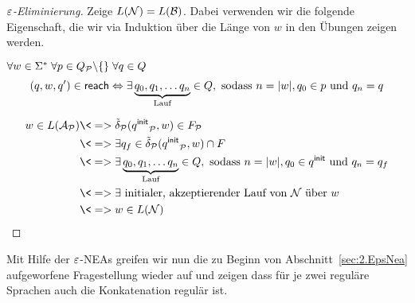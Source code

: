\begin{proof}[$\varepsilon$-Eliminierung]
        Zeige $L(\mathcal{N})=L(\mathcal{B})$. Dabei verwenden wir die folgende Eigenschaft, die wir via Induktion über die Länge von $w$ in den Übungen zeigen werden.
        
        $\forall w\in\Sigma^*\; \forall p\in Q_{\mathcal{P}}\backslash\{\}\; \forall q\in Q$
        $$(q,w,q')\in\textsf{reach} \Leftrightarrow \exists \underbrace{q_0, q_1,\ldots q_n}_{\text{Lauf}}\in Q, \text{ sodass }  n=|w|, q_0\in p \text{ und } q_n=q$$

        \begin{align*}
         w\in L(\A_\calP) 
         &\<=> \tilde\delta_\calP(\qinit_\calP,w)\in F_\calP\\
         &\<=> \exists q_f\in \tilde\delta_\calP(\qinit_\calP,w)\cap F\\
         &\<=> \exists \underbrace{q_0, q_1,\ldots q_n}_{\text{Lauf}}\in Q, \text{ sodass }  n=|w|, q_0\in \qinit \text{ und } q_n=q_f\\
         &\<=> \exists \text{ initialer, akzeptierender Lauf von $\calN$ über $w$} \\
         &\<=> w\in L(\calN)
        \end{align*}
\end{proof}


\medskip

Mit Hilfe der $\varepsilon$-NEAs greifen wir nun die zu Beginn von Abschnitt~\ref{sec:2.EpsNea} aufgeworfene Fragestellung wieder auf und zeigen dass für je zwei reguläre Sprachen auch die Konkatenation regulär ist.

